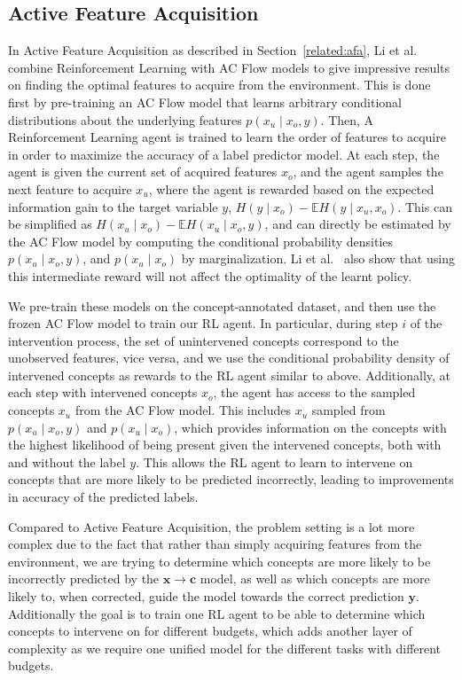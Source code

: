 \documentclass[../main.tex]{subfiles}
\begin{document}
\subsection{Active Feature Acquisition}

In Active Feature Acquisition as described in Section~\ref{related:afa},
Li et al.~\cite{afa} combine Reinforcement Learning with 
AC Flow models to give impressive results on finding the optimal features to acquire from the environment. This is done
first by pre-training an AC Flow model that learns arbitrary conditional distributions about the underlying
features $p(x_u \mid x_o, y)$. Then, A Reinforcement Learning agent is trained to learn 
the order of features to acquire in order to maximize the accuracy of a label predictor model. At each
step, the agent is given the current set of acquired features $x_o$, and the agent samples the next 
feature to acquire $x_u$, where the agent is rewarded based on the expected information gain
to the target variable $y$, $H(y \mid x_o) - \mathbb{E} H(y \mid x_u, x_o)$. This can be simplified as
$H(x_u \mid x_o) - \mathbb{E}H(x_u \mid x_o, y)$, and can directly be estimated by the AC 
Flow model by computing the conditional probability densities $p(x_u \mid x_o, y)$, and 
$p(x_u \mid x_o)$ by marginalization. Li et al.~\cite{afa} 
also show that using this intermediate reward will not affect the optimality of the learnt policy.

We pre-train these models on the concept-annotated dataset, and then use the frozen AC Flow
model to train our RL agent.
In particular, during step $i$ of the intervention process, the set of unintervened concepts correspond 
to the unobserved features, vice versa, and we use the conditional probability density of 
intervened concepts as rewards to the RL agent similar to above. Additionally, at each step
with intervened concepts $x_o$, the agent has access to the sampled concepts $x_u$ from the AC Flow model.
This includes $x_u$ sampled from $p(x_u \mid x_o, y)$ and $p(x_u \mid x_o)$, which provides information
on the concepts with the highest likelihood of being present given the intervened concepts, both with and without
the label $y$.  This allows the RL agent to learn to intervene on concepts that are 
more likely to be predicted incorrectly, leading to improvements in accuracy of the predicted labels.

Compared to Active Feature Acquisition, the problem setting is a lot more complex due to the fact that
rather than simply acquiring features from the environment, we are trying to determine
which concepts are more likely to be incorrectly predicted by the $\mathbf{x} \to \mathbf{c}$ model, as well as 
which concepts are more likely to, when corrected, guide the model towards the correct prediction $\mathbf{y}$.
Additionally the goal is to train one RL agent to be able to determine which concepts
to intervene on for different budgets, which adds another layer of complexity as we require
one unified model for the different tasks with different budgets.
\end{document}
